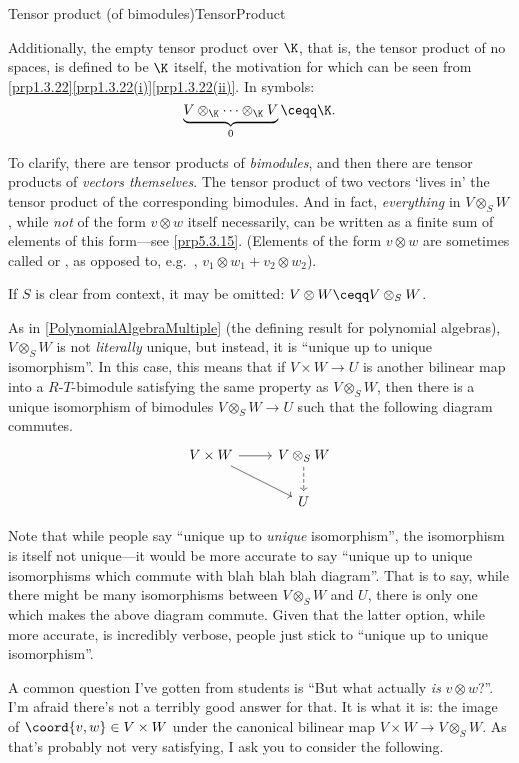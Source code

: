 \begin{thm}{Tensor product (of bimodules)}{TensorProduct}
\begin{rmk}
		Additionally, the empty tensor product over $\K$, that is, the tensor product of no spaces, is defined to be $\K$ itself, the motivation for which can be seen from \cref{prp1.3.22}\cref{prp1.3.22(i)}\cref{prp1.3.22(ii)}.  In symbols:
		\begin{equation}
			\underbrace{V\otimes _{\K}\cdots \otimes _{\K}V}_0\ceqq \K .
		\end{equation}
	\end{rmk}
	\begin{rmk}
		To clarify, there are tensor products of \emph{bimodules}, and then there are tensor products of \emph{vectors themselves}.  The tensor product of two vectors `lives in' the tensor product of the corresponding bimodules.  And in fact, \emph{everything} in $V\otimes _SW$, while \emph{not} of the form $v\otimes w$ itself necessarily, can be written as a finite sum of elements of this form---see \cref{prp5.3.15}.  (Elements of the form $v\otimes w$ are sometimes called  or , as opposed to, e.g.~, $v_1\otimes w_1+v_2\otimes w_2$).
	\end{rmk}
	\begin{rmk}
		If $S$ is clear from context, it may be omitted:  $V\otimes W\ceqq V\otimes _SW$\index[notation]{$V\otimes W$}.
	\end{rmk}
	\begin{rmk}
		As in \cref{PolynomialAlgebraMultiple} (the defining result for polynomial algebras), $V\otimes _SW$ is not \emph{literally} unique, but instead, it is ``unique up to unique isomorphism''.  In this case, this means that if $V\times W\rightarrow U$ is another bilinear map into a $R$-$T$-bimodule satisfying the same property as $V\otimes _SW$, then there is a unique isomorphism of bimodules $V\otimes _SW\rightarrow U$ such that the following diagram commutes.
		\begin{equation}
		\begin{tikzcd}
		V\times W \ar[r] \ar[rd] & V\otimes _SW \ar[d,dashed] \\
		& U
		\end{tikzcd}
		\end{equation}
		
		Note that while people say ``unique up to \emph{unique} isomorphism'', the isomorphism is itself not unique---it would be more accurate to say ``unique up to unique isomorphisms which commute with blah blah blah diagram''.  That is to say, while there might be many isomorphisms between $V\otimes _SW$ and $U$, there is only one which makes the above diagram commute.  Given that the latter option, while more accurate, is incredibly verbose, people just stick to ``unique up to unique isomorphism''.
	\end{rmk}
	\begin{rmk}
		A common question I've gotten from students is ``But what actually \emph{is} $v\otimes w$?''.  I'm afraid there's not a terribly good answer for that.  It is what it is:  the image of $\coord{v,w}\in V\times W$ under the canonical bilinear map $V\times W\rightarrow V\otimes _SW$.  As that's probably not very satisfying, I ask you to consider the following.
		

\end{rmk}
\end{thm}
